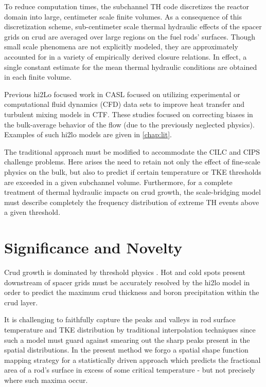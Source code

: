 To reduce computation times, the subchannel TH code discretizes the reactor
domain into large, centimeter scale finite volumes. As a consequence of this
discretization scheme, sub-centimeter scale thermal hydraulic effects of the
spacer grids on crud are averaged over large regions on the fuel rods'
surfaces.  Though small scale phenomena are not explicitly modeled, they are
approximately accounted for in a variety of empirically derived closure
relations.  In effect, a single constant estimate for the mean thermal
hydraulic conditions are obtained in each finite volume.

Previous hi2Lo focused work in CASL focused on utilizing experimental or computational fluid dynamics (CFD) data sets to improve heat transfer and turbulent mixing models in CTF.  These studies focused on
correcting biases in the bulk-average behavior of the flow (due to the
previously neglected physics).  Examples of such hi2lo models are given in
\autoref{chap:lit}.

The traditional approach must be modified to accommodate the CILC and CIPS
challenge problems.  Here arises the need to retain not only the effect of
fine-scale physics on the bulk, but also to predict if certain temperature or
TKE thresholds are exceeded in a given subchannel volume.  Furthermore, for a
complete treatment of thermal hydraulic impacts on crud growth, the
scale-bridging model must describe completely the frequency distribution of
extreme TH events above a given threshold.


\section{Significance and Novelty}

Crud growth is dominated by threshold physics \cite{mongoose17}.  Hot and cold spots
present downstream of spacer grids must be accurately resolved by the hi2lo model
in order to predict the maximum crud
thickness and boron precipitation within the crud layer.

It is challenging to faithfully capture the peaks and valleys in
rod surface temperature and TKE distribution by traditional interpolation
techniques since such a model must guard against smearing out the sharp peaks
present in the spatial distributions.
In the present method we forgo a spatial shape function mapping strategy
for a statistically driven approach which predicts the fractional
area of a rod's surface in excess of some critical temperature - but not
precisely where such maxima occur.

